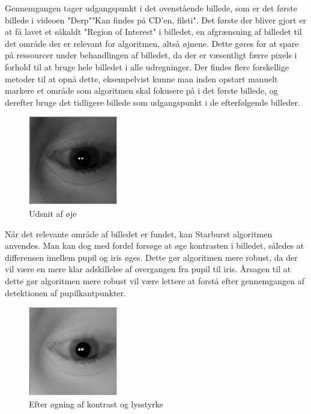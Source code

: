 \documentclass[a4paper,oneside,12pt]{article}
\begin{document}
	Gennemgangen tager udgangspunkt i det ovenstående billede, som er det første billede i videoen "Derp""Kan findes på CD'en, filsti". Det første der bliver gjort er at få lavet et såkaldt "Region of Interest" i billedet, en afgrænsning af billedet til det område der er relevant for algoritmen, altså øjnene. Dette gøres for at spare på ressourcer under behandlingen af billedet, da der er væsentligt færre pixels i forhold til at bruge hele billedet i alle udregninger. Der findes flere forskellige metoder til at opnå dette, eksempelvist kunne man inden opstart manuelt markere et område som algoritmen skal fokusere på i det første billede, og derefter bruge det tidligere billede som udgangspunkt i de efterfølgende billeder.
	
	\begin{figure}
	\centering
	\includegraphics[width=0.4\linewidth]{Billeder/CroppedEye.png}
	\caption{Udsnit af øje}
	\label{fig:CroppedEye}
	\end{figure}
	
	Når det relevante område af billedet er fundet, kan Starburst algoritmen anvendes. Man kan dog med fordel forsøge at øge kontrasten i billedet, således at differensen imellem pupil og iris øges. Dette gør algoritmen mere robust, da der vil være en mere klar adskillelse af overgangen fra pupil til iris. Årsagen til at dette gør algoritmen mere robust vil være lettere at forstå efter gennemgangen af detektionen af pupilkantpunkter.
	
	\begin{figure}
	\centering
	\includegraphics[width=0.4\linewidth]{Billeder/CroppedEye,PostBrightness.png}
	\caption{Efter øgning af kontrast og lysstyrke}
	\label{fig:CroppedEye,PostBrightness}
	\end{figure}
	
\end{document}
